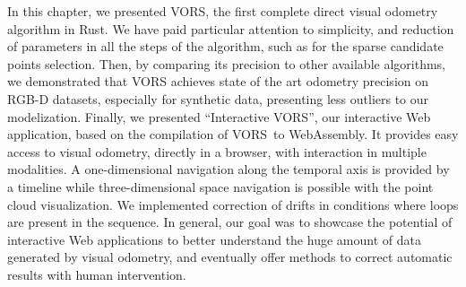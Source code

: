 In this chapter, we presented VORS,
the first complete direct visual odometry algorithm in Rust.
We have paid particular attention to simplicity,
and reduction of parameters in all the steps of the algorithm,
such as for the sparse candidate points selection.
Then, by comparing its precision to other available algorithms,
we demonstrated that VORS achieves state of the art odometry precision on RGB-D datasets,
especially for synthetic data, presenting less outliers to our modelization.
Finally, we presented ``Interactive VORS'',
our interactive Web application, based on the compilation of VORS to WebAssembly.
It provides easy access to visual odometry, directly in a browser,
with interaction in multiple modalities.
A one-dimensional navigation along the temporal axis is provided by a timeline
while three-dimensional space navigation is possible with the point cloud visualization.
We implemented correction of drifts in conditions where loops are present in the sequence.
In general, our goal was to showcase the potential of interactive Web applications
to better understand the huge amount of data generated by visual odometry,
and eventually offer methods to correct automatic results with human intervention.
